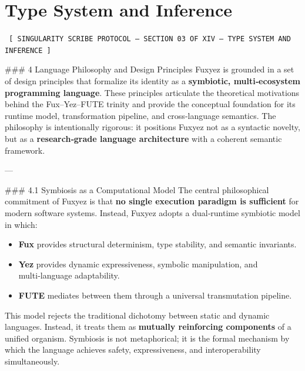 \documentclass[12pt, a4paper]{book}
\begin{document}
    \chapter*{Type System and Inference}
    
    
    \begin{glyphbox}
    \centering
    \color{neonCyan}\fontsize{8}{10}\selectfont\texttt{
    [ SINGULARITY SCRIBE PROTOCOL -- SECTION 03 OF XIV -- TYPE SYSTEM AND INFERENCE ]
    }
    \end{glyphbox}
    \vspace{0.3cm}
    
    
    \#\#\# 4 Language Philosophy and Design Principles  
Fuxyez is grounded in a set of design principles that formalize its identity as a \textbf{symbiotic, multi‑ecosystem programming language}. These principles articulate the theoretical motivations behind the Fux–Yez–FUTE trinity and provide the conceptual foundation for its runtime model, transformation pipeline, and cross‑language semantics. The philosophy is intentionally rigorous: it positions Fuxyez not as a syntactic novelty, but as a \textbf{research‑grade language architecture} with a coherent semantic framework.

---

\#\#\# 4.1 Symbiosis as a Computational Model  
The central philosophical commitment of Fuxyez is that \textbf{no single execution paradigm is sufficient} for modern software systems. Instead, Fuxyez adopts a dual‑runtime symbiotic model in which:

\begin{itemize}
  \item \textbf{Fux} provides structural determinism, type stability, and semantic invariants.  
  \item \textbf{Yez} provides dynamic expressiveness, symbolic manipulation, and multi‑language adaptability.  
  \item \textbf{FUTE} mediates between them through a universal transmutation pipeline.
\end{itemize}

This model rejects the traditional dichotomy between static and dynamic languages. Instead, it treats them as \textbf{mutually reinforcing components} of a unified organism. Symbiosis is not metaphorical; it is the formal mechanism by which the language achieves safety, expressiveness, and interoperability simultaneously.
\end{document}
